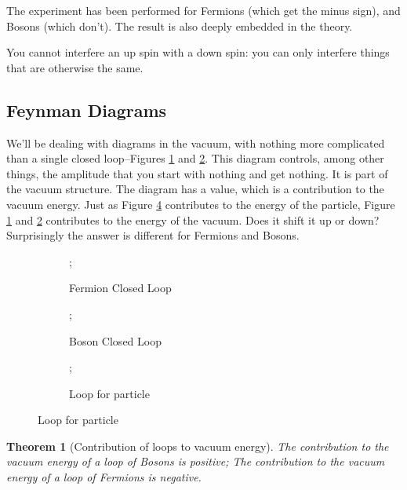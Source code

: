 \documentclass[]{article}
\newtheorem{thm}{Theorem}
\begin{document}
The experiment has been performed for Fermions (which get the minus sign), and Bosons (which don't). The result is also deeply embedded in the theory.

You cannot interfere an up spin with a down spin: you can only interfere things that are otherwise the same.

\subsection{Feynman Diagrams}

We'll be dealing with diagrams in the vacuum, with nothing more complicated than a single closed loop--Figures \ref{fig:particles3-2-loops} and \ref{fig:particles3-2-loops-boson}. This diagram controls, among other things, the amplitude that you start with nothing and get nothing. It is part of the vacuum structure. The diagram has a  value, which is a contribution to the vacuum energy. Just as Figure \ref{fig:particles3-2-loops-p} contributes to the energy of the particle, Figure \ref{fig:particles3-2-loops} and \ref{fig:particles3-2-loops-boson} contributes to the energy of the vacuum. Does it shift it up or down? Surprisingly the answer is different for Fermions and Bosons.


\begin{figure}[H]
	\caption{Closed Loops Feynman diagrams}
	\begin{subfigure}[t]{0.3\textwidth}
		\caption{Fermion Closed Loop}\label{fig:particles3-2-loops}
		;
	\end{subfigure}
	\begin{subfigure}[t]{0.3\textwidth}
		\caption{Boson Closed Loop}\label{fig:particles3-2-loops-boson}
		;
	\end{subfigure}
	\begin{subfigure}[t]{0.3\textwidth}
		\caption{Loop for particle}\label{fig:particles3-2-loops-p}
		;
	\end{subfigure}
\end{figure}

\begin{thm}[Contribution of loops to vacuum energy]
	The contribution to the vacuum energy of a loop of Bosons is positive;
	The contribution to the vacuum energy of a loop of Fermions is negative.
\end{thm}
\end{document}
